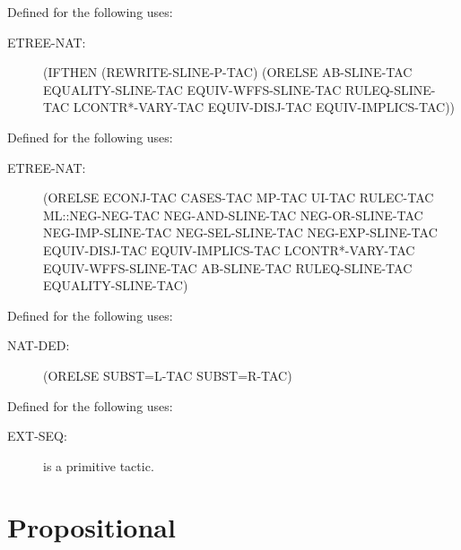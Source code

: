\begin{description}
\begin{description}
\end{description}

\item[REWRITE-SLINE-TAC]  Defined for the following uses:
\begin{description}
\item[ETREE-NAT:] 
(IFTHEN (REWRITE-SLINE-P-TAC)
 (ORELSE AB-SLINE-TAC EQUALITY-SLINE-TAC EQUIV-WFFS-SLINE-TAC
  RULEQ-SLINE-TAC LCONTR*-VARY-TAC EQUIV-DISJ-TAC EQUIV-IMPLICS-TAC))


\end{description}

\item[SLINE-TAC]  Defined for the following uses:
\begin{description}
\item[ETREE-NAT:] 
(ORELSE ECONJ-TAC CASES-TAC MP-TAC UI-TAC RULEC-TAC ML::NEG-NEG-TAC
 NEG-AND-SLINE-TAC NEG-OR-SLINE-TAC NEG-IMP-SLINE-TAC NEG-SEL-SLINE-TAC
 NEG-EXP-SLINE-TAC EQUIV-DISJ-TAC EQUIV-IMPLICS-TAC LCONTR*-VARY-TAC
 EQUIV-WFFS-SLINE-TAC AB-SLINE-TAC RULEQ-SLINE-TAC EQUALITY-SLINE-TAC)


\end{description}

\item[SUB=-TAC]  Defined for the following uses:
\begin{description}
\item[NAT-DED:] 
(ORELSE SUBST=L-TAC SUBST=R-TAC)


\end{description}

\item[TRUE+TAC]  Defined for the following uses:
\begin{description}
\item[EXT-SEQ:]  is a primitive tactic.

\end{description}

\item
\end{description}

\section{Propositional}

